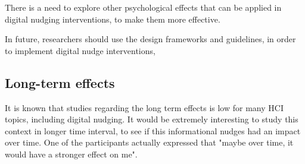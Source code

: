 There is a need to explore other psychological effects that can be applied in digital nudging interventions, to make them more effective.

In future, researchers should use the design frameworks and guidelines, in order to implement digital nudge interventions, 



\subsection{Long-term effects}
It is known that studies regarding the long term effects is low for many HCI topics, including digital nudging. It would be extremely interesting to study this context in longer time interval, to see if this informational nudges had an impact over time. One of the participants actually expressed that "maybe over time, it would have a stronger effect on me". 